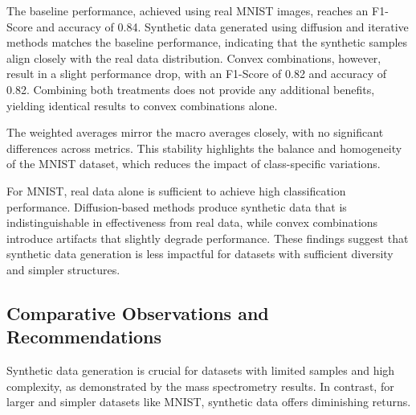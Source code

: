 \documentclass[sigconf]{acmart}
\begin{document}
The baseline performance, achieved using real MNIST images, reaches an F1-Score and accuracy of 0.84. Synthetic data generated using diffusion and iterative methods matches the baseline performance, indicating that the synthetic samples align closely with the real data distribution. Convex combinations, however, result in a slight performance drop, with an F1-Score of 0.82 and accuracy of 0.82. Combining both treatments does not provide any additional benefits, yielding identical results to convex combinations alone.

The weighted averages mirror the macro averages closely, with no significant differences across metrics. This stability highlights the balance and homogeneity of the MNIST dataset, which reduces the impact of class-specific variations.

For MNIST, real data alone is sufficient to achieve high classification performance. Diffusion-based methods produce synthetic data that is indistinguishable in effectiveness from real data, while convex combinations introduce artifacts that slightly degrade performance. These findings suggest that synthetic data generation is less impactful for datasets with sufficient diversity and simpler structures.

\subsection{Comparative Observations and Recommendations}

Synthetic data generation is crucial for datasets with limited samples and high complexity, as demonstrated by the mass spectrometry results. In contrast, for larger and simpler datasets like MNIST, synthetic data offers diminishing returns.
\end{document}
